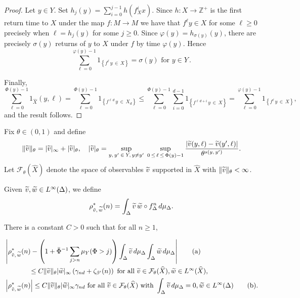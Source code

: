 \documentclass[AHL,Unicode,longabstracts,published]{cedram}
\newcommand{\Z}{\mathbb{Z}}
\newcommand{\cF}{\mathcal{F}}
\newcommand{\hX}{\widehat{X}}
\newcommand{\tw}{\widetilde{w}}
\newcommand{\tv}{\tilde{v}}
\newcommand{\bPhi}{\bar{\Phi}}
\let\oldtilde\tilde
\renewcommand*{\tilde}[1]{\mathchoice{\widetilde{#1}}{\widetilde{#1}}{\oldtilde{#1}}{\oldtilde{#1}}}
\begin{document}
\begin{proof}
Let $y\in Y$. Set $h_j(y)=\sum_{i=0}^{j-1}h(f_X^ix)$. Since $h:X\to\Z^+$ is the first return time to $X$ under the map $f:M\to M$ we have that $f^\ell y\in X$ for some $\ell\ge 0$ precisely when $\ell=h_j(y)$ for some $j\ge0$. Since $\varphi(y)=h_{\sigma(y)}(y)$, there are precisely $\sigma(y)$ returns of $y$ to $X$ under $f$ by time $\varphi(y)$. Hence
\[
\sum_{\ell=0}^{\varphi(y)-1}1_{\left\{f^\ell\,y\,\in\,X\right\}} = \sigma(y)\text{ for }y\in Y\,.
\]

Finally,
\[
\sum_{\ell=0}^{\Phi(y)-1}1_{\hX}(y,\ell) =
\sum_{\ell=0}^{\Phi(y)-1}1_{\left\{f^{\ell\,d}\,y\,\in\,X_d\right\}}
\le \sum_{\ell=0}^{\Phi(y)-1}\sum_{i=0}^{d-1}1_{\left\{f^{\ell\,d+i}\,y\,\in\,X\right\}} =\sum_{\ell=0}^{\varphi(y)-1}1_{\left\{f^\ell\,y\,\in\, X\right\}},
\]
and the result follows.
\end{proof}


Fix $\theta\in(0,1)$ and define
\begin{equation}\label{eq:norm1}
\|\tv\|_\theta=|\tv|_\infty+|\tv|_\theta, \quad |\tv|_\theta =\sup_{y,\,y'\:\in\:Y,\,y\neq y'}\;\sup_{0\,\le\,\ell\,\le \,\Phi(y)-1}\frac{|\tv(y,\ell)-\tv(y',\ell)|}{\theta^{s(y,\,y')}}.
\end{equation}
Let $\cF_\theta(\hX)$ denote the space of observables $\tv$ supported in $\hX$ with $\|\tv\|_\theta<\infty$.

Given $\tv,\tw\in L^\infty(\Delta)$, we define
\[
\rho^*_{\tv,\,\tw}(n)= \int_\Delta\tv\,\tw\circ f_\Delta^n\,d\mu_\Delta.
\]

\begin{theo} \label{thm:Delta}
There is a constant $C>0$ such that for all $n\ge1$,

\begin{align}
&\left|\rho^*_{\tv,\,\tw}(n)-\left(1+\bPhi^{-1}\sum_{j>n} \mu_Y(\Phi>j)\right)\int_\Delta\tv\,d\mu_\Delta\int_\Delta\tw\,d\mu_\Delta\right|\tag{${\rm a}$}\label{theo4.2.1}\\
&\mkern65mu\le C\|\tv\|_\theta|\tw|_\infty\left(\gamma_{nd}+\zeta_{\beta'}(n)\right)\text{ for all }\tv\in \cF_\theta(\hX), \tw\in L^\infty(\hX),\nonumber\\
&\left|\rho^*_{\tv,\,\tw}(n)\right|\le C\|\tv\|_\theta|\tw|_\infty\gamma_{nd}\text{ for all }\tv\in \cF_\theta(\hX)\text{ with }\int_\Delta \tv\,d\mu_\Delta=0, \tw\in L^\infty(\Delta)\tag{${\rm b}$}\label{theo4.2.2}.
\end{align}
\end{theo}
\end{document}
